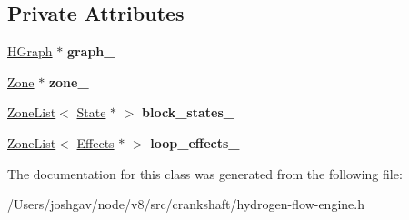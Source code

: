 \subsection*{Private Attributes}
\begin{DoxyCompactItemize}
\item 
\hyperlink{classv8_1_1internal_1_1_h_graph}{H\+Graph} $\ast$ {\bfseries graph\+\_\+}\hypertarget{classv8_1_1internal_1_1_h_flow_engine_a7231fbb7bf1ff3da8f0d5d40f9cc9db1}{}\label{classv8_1_1internal_1_1_h_flow_engine_a7231fbb7bf1ff3da8f0d5d40f9cc9db1}

\item 
\hyperlink{classv8_1_1internal_1_1_zone}{Zone} $\ast$ {\bfseries zone\+\_\+}\hypertarget{classv8_1_1internal_1_1_h_flow_engine_a54de5d811be765cbbf37018070538b7b}{}\label{classv8_1_1internal_1_1_h_flow_engine_a54de5d811be765cbbf37018070538b7b}

\item 
\hyperlink{classv8_1_1internal_1_1_zone_list}{Zone\+List}$<$ \hyperlink{classv8_1_1internal_1_1_state}{State} $\ast$ $>$ {\bfseries block\+\_\+states\+\_\+}\hypertarget{classv8_1_1internal_1_1_h_flow_engine_a9c4e839abc2664cb131c66a3006e3827}{}\label{classv8_1_1internal_1_1_h_flow_engine_a9c4e839abc2664cb131c66a3006e3827}

\item 
\hyperlink{classv8_1_1internal_1_1_zone_list}{Zone\+List}$<$ \hyperlink{classv8_1_1internal_1_1_effects}{Effects} $\ast$ $>$ {\bfseries loop\+\_\+effects\+\_\+}\hypertarget{classv8_1_1internal_1_1_h_flow_engine_a5be08f0906f0a23c488e533cae5e5ab3}{}\label{classv8_1_1internal_1_1_h_flow_engine_a5be08f0906f0a23c488e533cae5e5ab3}

\end{DoxyCompactItemize}


The documentation for this class was generated from the following file\+:\begin{DoxyCompactItemize}
\item 
/\+Users/joshgav/node/v8/src/crankshaft/hydrogen-\/flow-\/engine.\+h\end{DoxyCompactItemize}
